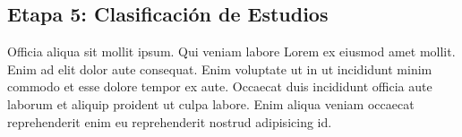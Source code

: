 \subsection{Etapa 5: Clasificación de Estudios}

Officia aliqua sit mollit ipsum. Qui veniam labore Lorem ex eiusmod amet mollit. Enim ad elit dolor aute consequat. Enim voluptate ut in ut incididunt minim commodo et esse dolore tempor ex aute. Occaecat duis incididunt officia aute laborum et aliquip proident ut culpa labore. Enim aliqua veniam occaecat reprehenderit enim eu reprehenderit nostrud adipisicing id.
